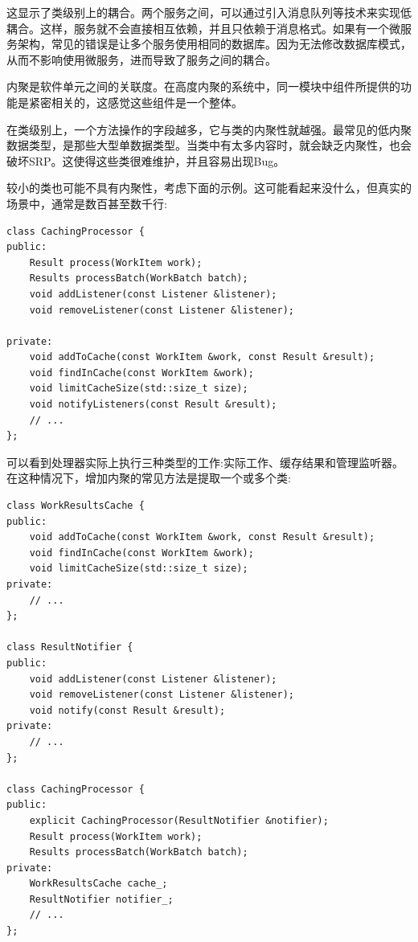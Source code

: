这显示了类级别上的耦合。两个服务之间，可以通过引入消息队列等技术来实现低耦合。这样，服务就不会直接相互依赖，并且只依赖于消息格式。如果有一个微服务架构，常见的错误是让多个服务使用相同的数据库。因为无法修改数据库模式，从而不影响使用微服务，进而导致了服务之间的耦合。


内聚是软件单元之间的关联度。在高度内聚的系统中，同一模块中组件所提供的功能是紧密相关的，这感觉这些组件是一个整体。

在类级别上，一个方法操作的字段越多，它与类的内聚性就越强。最常见的低内聚数据类型，是那些大型单数据类型。当类中有太多内容时，就会缺乏内聚性，也会破坏SRP。这使得这些类很难维护，并且容易出现Bug。

较小的类也可能不具有内聚性，考虑下面的示例。这可能看起来没什么，但真实的场景中，通常是数百甚至数千行:

\begin{lstlisting}[style=styleCXX]
class CachingProcessor {
public:
	Result process(WorkItem work);
	Results processBatch(WorkBatch batch);
	void addListener(const Listener &listener);
	void removeListener(const Listener &listener);
	
private:
	void addToCache(const WorkItem &work, const Result &result);
	void findInCache(const WorkItem &work);
	void limitCacheSize(std::size_t size);
	void notifyListeners(const Result &result);
	// ...
};
\end{lstlisting}

可以看到处理器实际上执行三种类型的工作:实际工作、缓存结果和管理监听器。在这种情况下，增加内聚的常见方法是提取一个或多个类:

\begin{lstlisting}[style=styleCXX]
class WorkResultsCache {
public:
	void addToCache(const WorkItem &work, const Result &result);
	void findInCache(const WorkItem &work);
	void limitCacheSize(std::size_t size);
private:
	// ...
};

class ResultNotifier {
public:
	void addListener(const Listener &listener);
	void removeListener(const Listener &listener);
	void notify(const Result &result);
private:
	// ...
};

class CachingProcessor {
public:
	explicit CachingProcessor(ResultNotifier &notifier);
	Result process(WorkItem work);
	Results processBatch(WorkBatch batch);
private:
	WorkResultsCache cache_;
	ResultNotifier notifier_;
	// ...
};
\end{lstlisting}

